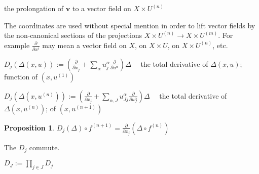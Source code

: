 \documentclass[12pt]{article}
\numberwithin{equation}{section}
\theoremstyle{plain}
\newtheorem{proposition}[definition]{Proposition}
\newtheorem{formula}{Formula}[section]
\theoremstyle{definition}
\newcommand{\ra}{\rightarrow}
\newcommand{\s}{\quad}
\renewcommand{\sp}[2][1.3cm]{\makebox[#1][l]{#2}}
\begin{document}
\sp[3.0cm]{$\operatorname{pr}^{(n)}\mathbf{v}:=\psi'(0)$} the prolongation of $\mathbf{v}$ to a vector field on $X\times U^{(n)}$

The coordinates are used without special mention in order to lift vector fields by the non-canonical sections of the projections $X\times U^{(n)}\ra X\times U^{(m)}$. For example $\frac{\partial}{\partial x^{i}}$ may mean a vector field on $X$, on $X\times U$, on $X\times U^{(n)}$, etc.


$D_j( \Delta(x,u) ):= (\frac{\partial}{\partial x_j} + \sum_{\alpha} u^{\alpha}_j \frac{\partial}{\partial u^{\alpha}}) \Delta\s$ the total derivative of $\Delta(x,u)$; function of $(x,u^{(1)})$

$D_j( \Delta(x,u^{(n)}) ):= (\frac{\partial}{\partial x_j} + \sum_{\alpha,J} u^{\alpha}_{Jj} \frac{\partial}{\partial u^{\alpha}_{J}}) \Delta\s$ the total derivative of $\Delta(x,u^{(n)})$; of $(x,u^{(n+1)})$

\begin{proposition}\label{totalderiv} $D_j(\Delta) \circ f^{(n+1)}=\frac{\partial}{\partial x_j}(\Delta\circ f^{(n)})$
\end{proposition}

The $D_j$ commute.

$D_J:=\prod_{j\in J}D_j$

\end{document}
